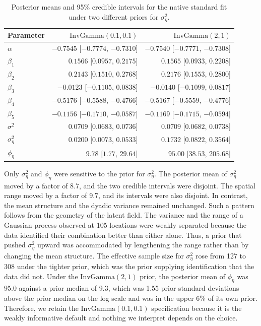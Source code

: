 \documentclass{article}
\begin{document}
\begin{table}[h]
\caption{Posterior means and 95\% credible intervals for the native standard fit under two different priors for $\sigma^2_\eta$.}
\label{tab:g6}
\centering\small
\begin{tabular}{l|rr}
Parameter & $\text{InvGamma}(0.1,0.1)$ & $\text{InvGamma}(2,1)$ \\ \hline
$\alpha$          & $-0.7545$ [$-0.7774$, $-0.7310$] & $-0.7540$ [$-0.7771$, $-0.7308$] \\
$\beta_1$         & $0.1566$ [$0.0957$, $0.2175$]    & $0.1565$ [$0.0933$, $0.2208$] \\
$\beta_2$         & $0.2143$ [$0.1510$, $0.2768$]    & $0.2176$ [$0.1553$, $0.2800$] \\
$\beta_3$         & $-0.0123$ [$-0.1105$, $0.0838$]  & $-0.0140$ [$-0.1099$, $0.0817$] \\
$\beta_4$         & $-0.5176$ [$-0.5588$, $-0.4766$] & $-0.5167$ [$-0.5559$, $-0.4776$] \\
$\beta_5$         & $-0.1156$ [$-0.1710$, $-0.0587$] & $-0.1169$ [$-0.1715$, $-0.0594$] \\
$\sigma^2$        & $0.0709$ [$0.0683$, $0.0736$]    & $0.0709$ [$0.0682$, $0.0738$] \\
$\sigma^2_\eta$   & $0.0200$ [$0.0073$, $0.0533$]    & $0.1732$ [$0.0822$, $0.3564$] \\
$\phi_\eta$       & $9.78$ [$1.77$, $29.64$]         & $95.00$ [$38.53$, $205.68$]
\end{tabular}
\end{table}
 
Only $\sigma^2_\eta$ and $\phi_\eta$ were sensitive to the prior for $\sigma^2_\eta$.
The posterior mean of $\sigma^2_\eta$ moved by a factor of 8.7, and the two
credible intervals were disjoint. The spatial range moved by a factor of
9.7, and its intervals were also disjoint. In contrast, the mean structure and the dyadic variance remained unchanged.
Such a pattern follows from the geometry of the latent field. The variance and the
range of a Gaussian process observed at 105 locations were weakly separated
because the data identified their combination better than either alone. Thus, a prior that pushed $\sigma^2_\eta$ upward was accommodated by lengthening the range
rather than by changing the mean structure. The effective sample size for $\sigma^2_\eta$ rose from 127 to 308 under the tighter prior, which was the prior
supplying identification that the data did not.
Under
the $\text{InvGamma}(2,1)$ prior, the posterior mean of $\phi_\eta$ was 95.0 against a prior
median of 9.3, which was 1.55 prior standard deviations above the prior median on the log scale and was in the upper 6\% of its own prior. Therefore, we retain the $\text{InvGamma}(0.1,0.1)$ specification because it is the weakly informative default and nothing we interpret depends on the choice.
 
\end{document}

